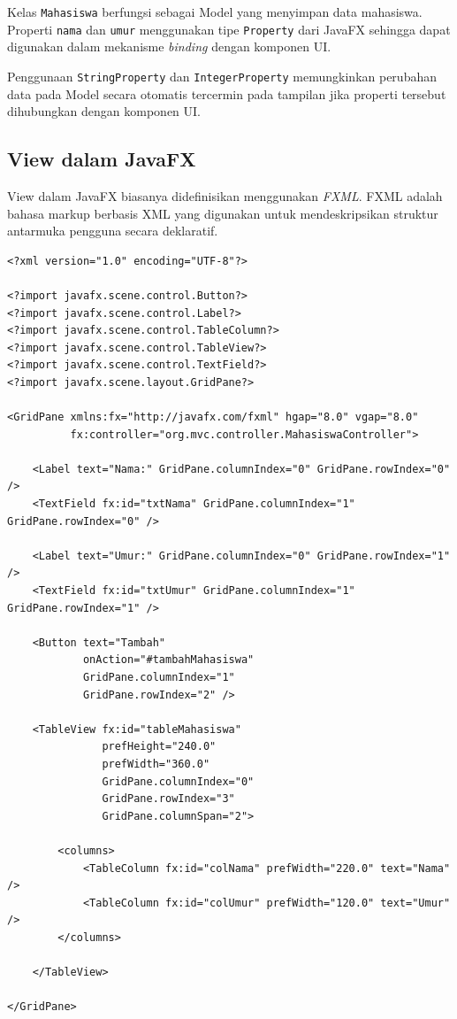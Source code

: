 Kelas \texttt{Mahasiswa} berfungsi sebagai Model yang menyimpan data mahasiswa. Properti \texttt{nama} dan \texttt{umur} menggunakan tipe \texttt{Property} dari JavaFX sehingga dapat digunakan dalam mekanisme \textit{binding} dengan komponen UI.

Penggunaan \texttt{StringProperty} dan \texttt{IntegerProperty} memungkinkan perubahan data pada Model secara otomatis tercermin pada tampilan jika properti tersebut dihubungkan dengan komponen UI.

\subsection{View dalam JavaFX}

View dalam JavaFX biasanya didefinisikan menggunakan \textit{FXML}. FXML adalah bahasa markup berbasis XML yang digunakan untuk mendeskripsikan struktur antarmuka pengguna secara deklaratif.

\begin{lstlisting}[style=JavaStyle, caption=View menggunakan FXML dalam JavaFX]
<?xml version="1.0" encoding="UTF-8"?>

<?import javafx.scene.control.Button?>
<?import javafx.scene.control.Label?>
<?import javafx.scene.control.TableColumn?>
<?import javafx.scene.control.TableView?>
<?import javafx.scene.control.TextField?>
<?import javafx.scene.layout.GridPane?>

<GridPane xmlns:fx="http://javafx.com/fxml" hgap="8.0" vgap="8.0"
          fx:controller="org.mvc.controller.MahasiswaController">

    <Label text="Nama:" GridPane.columnIndex="0" GridPane.rowIndex="0" />
    <TextField fx:id="txtNama" GridPane.columnIndex="1" GridPane.rowIndex="0" />

    <Label text="Umur:" GridPane.columnIndex="0" GridPane.rowIndex="1" />
    <TextField fx:id="txtUmur" GridPane.columnIndex="1" GridPane.rowIndex="1" />

    <Button text="Tambah"
            onAction="#tambahMahasiswa"
            GridPane.columnIndex="1"
            GridPane.rowIndex="2" />

    <TableView fx:id="tableMahasiswa"
               prefHeight="240.0"
               prefWidth="360.0"
               GridPane.columnIndex="0"
               GridPane.rowIndex="3"
               GridPane.columnSpan="2">

        <columns>
            <TableColumn fx:id="colNama" prefWidth="220.0" text="Nama" />
            <TableColumn fx:id="colUmur" prefWidth="120.0" text="Umur" />
        </columns>

    </TableView>

</GridPane>
\end{lstlisting}

